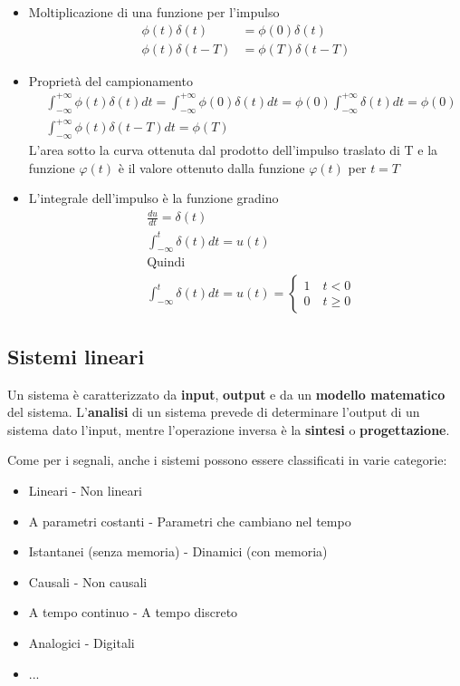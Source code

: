 \documentclass[a4paper, titlepage]{article}
\begin{document}
\begin{itemize}
	\item Moltiplicazione di una funzione per l'impulso
	\begin{align*}
	\phi(t)\delta(t)&=\phi(0)\delta(t)\\
	\phi(t)\delta(t-T)&=\phi(T)\delta(t-T)
	\end{align*}
	
	\item Proprietà del campionamento
	\begin{align*}
	&\int_{-\infty}^{+\infty} \phi(t)\delta(t)dt=\int_{-\infty}^{+\infty} \phi(0)\delta(t)dt=\phi(0)\int_{-\infty}^{+\infty} \delta(t)dt=\phi(0)\\
	&\int_{-\infty}^{+\infty} \phi(t)\delta(t-T)dt=\phi(T)
	\end{align*}
	L'area sotto la curva ottenuta dal prodotto dell'impulso traslato di T e la funzione $\varphi(t)$ è il valore ottenuto dalla funzione $\varphi(t)$ per $t=T$
	
	\item L'integrale dell'impulso è la funzione gradino
	\begin{align*}
		&\frac{du}{dt}=\delta(t)\\
		&\int_{-\infty}^{t}\delta(t)dt=u(t)\\
		&\text{Quindi}\\
		&\int_{-\infty}^{t}\delta(t)dt=u(t)=
		\left\{
		\begin{array}{ll}
		1 \quad t<0\\
		0 \quad t\geq0
		\end{array}
		\right.
	\end{align*}
\end{itemize}

\subsection{Sistemi lineari}
Un sistema è caratterizzato da \textbf{input}, \textbf{output} e da un \textbf{modello matematico} del sistema. L'\textbf{analisi} di un sistema prevede di determinare l'output di un sistema dato l'input, mentre l'operazione inversa è la \textbf{sintesi} o \textbf{progettazione}.

Come per i segnali, anche i sistemi possono essere classificati in varie categorie:
\begin{itemize}
	\item Lineari - Non lineari
	\item A parametri costanti - Parametri che cambiano nel tempo
	\item Istantanei (senza memoria) - Dinamici (con memoria)
	\item Causali - Non causali
	\item A tempo continuo - A tempo discreto
	\item Analogici - Digitali
	\item ...
\end{itemize}
\end{document}
